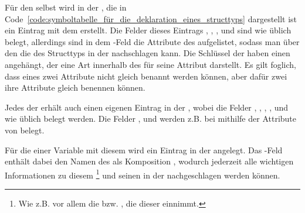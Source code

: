 Für den  selbst wird in der , die in Code~\ref{code:symboltabelle_für_die_deklaration_eines_structtyps} dargestellt ist ein Eintrag mit dem   erstellt. Die Felder dieses Eintrags , ,  ,  und  sind wie üblich belegt, allerdings sind in dem -Feld die Attribute des   aufgelistet, sodass man über den   die   des Structtyps in der   nachschlagen kann. Die Schlüssel der  haben einen   angehängt, der eine Art  innerhalb des  für seine Attribut darstellt. Es gilt foglich, dass  eines  zwei Attribute nicht gleich benannt werden können, aber dafür zwei   ihre Attribute gleich benennen können.

Jedes der   erhält auch einen eigenen Eintrag in der , wobei die Felder , ,  , ,  und  wie üblich belegt werden. Die Felder ,  und  werden z.B. bei  mithilfe der Attribute von \smalltt{Alloc(Writeable(), ArrayDecl([Num('2')], IntType('int')), Name('ar'))])} belegt.

Für die  einer Variable  mit diesem   wird ein Eintrag in der  angelegt. Das -Feld enthält dabei den Namen des  als Komposition , wodurch jederzeit alle wichtigen Informationen zu diesem \footnote{Wie z.B. vor allem die  bzw. , die dieser  einnimmt.} und seinen  in der   nachgeschlagen werden können.

